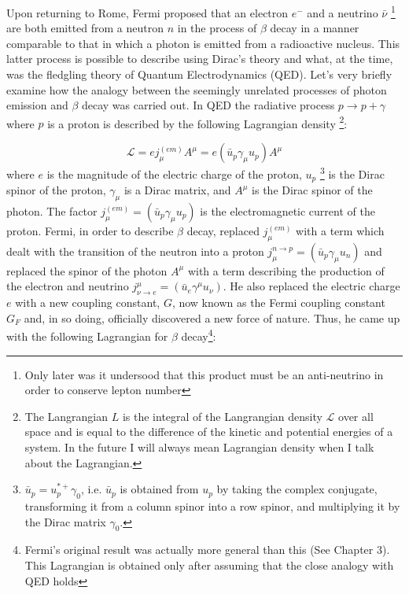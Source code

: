 \documentclass[12pt]{book}
\begin{document}
Upon returning to Rome, Fermi proposed that an electron $e^{-}$ and a neutrino $\bar{\nu}$ \footnote{Only later was it undersood that this product must be an anti-neutrino in order to conserve lepton number} are both emitted from a neutron $n$ in the process of $\beta$ decay in a manner comparable to that in which a photon is emitted from a radioactive nucleus. This latter process is possible to describe using Dirac's  theory and what, at the time, was the fledgling theory of Quantum Electrodynamics (QED). Let's very briefly examine how the analogy between the seemingly unrelated processes of photon emission and $\beta$ decay was carried out. In QED the radiative process $p\longrightarrow p+\gamma$ where $p$ is a proton is described by the following Lagrangian density \footnote{The Langrangian $L$ is the integral of the Langrangian density $\mathcal{L}$ over all space and is equal to the difference of the kinetic and potential energies of a system. In the future I will always mean Lagrangian density when I talk about the Lagrangian.}:

\begin{equation}
 \mathcal{L}=ej_{\mu}^{(em)}A^{\mu}=e\left(\bar{u}_{p}\gamma_{\mu} u_{p}\right)A^{\mu}
\end{equation}
where $e$ is the magnitude of the electric charge of the proton, $u_{p}$ \footnote{$\bar{u}_{p}=u_{p}^{*+}\gamma_{0}$, i.e. $\bar{u}_{p}$ is obtained from $u_{p}$ by taking the complex conjugate, transforming it from a column spinor into a row spinor, and multiplying it by the Dirac matrix $\gamma_{0}$.} is the Dirac spinor of the proton, $\gamma_{\mu}$ is a Dirac matrix, and $A^{\mu}$ is the Dirac spinor of the photon. The factor $j_{\mu}^{(em)}=\left(\bar{u}_{p}\gamma_{\mu} u_{p}\right)$ is the electromagnetic current of the proton. Fermi, in order to describe $\beta$ decay, replaced $j_{\mu}^{(em)}$ with a term which dealt with the transition of the neutron into a proton $j_{\mu}^{n\rightarrow p}=\left(\bar{u}_{p}\gamma_{\mu} u_{n}\right)$ and replaced the spinor of the photon $A^{\mu}$ with a term describing the production of the electron and neutrino $j_{\nu \rightarrow e}^{\mu}=\left(\bar{u}_{e}\gamma^{\mu} u_{\nu}\right)$. He also replaced the electric charge $e$ with a new coupling constant, $G$, now known as the Fermi coupling constant $G_{F}$ \cite{morii} and, in so doing, officially discovered a new force of nature. Thus, he came up with the following Lagrangian for $\beta$ decay\footnote{Fermi's original result was actually more general than this (See Chapter 3). This Lagrangian is obtained only after assuming that the close analogy with QED holds}:
\end{document}
